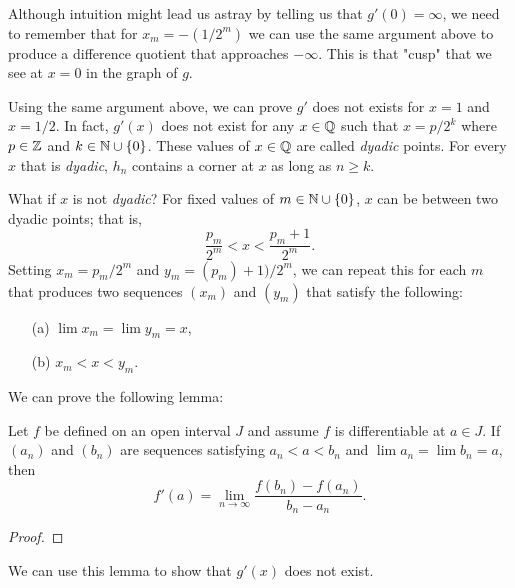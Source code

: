 Although intuition might lead us astray by telling us that \( g'(0) = \infty  \), we need to remember that for \( x_m = -(1/2^m) \) we can use the same argument above to produce a difference quotient that approaches \( - \infty  \). This is that "cusp" that we see at \( x = 0  \) in the graph of \( g  \). 

Using the same argument above, we can prove \( g' \) does not exists for \( x = 1  \) and \( x = 1 / 2 \). In fact, \( g'(x)  \) does not exist for any \( x \in \mathbb{Q}  \) such that \( x = p/2^k \) where \( p \in \mathbb{Z}  \) and \( k \in \mathbb{N} \cup \{ 0 \}  \). These values of \( x \in \mathbb{Q}  \) are called \textit{dyadic} points. For every \( x  \) that is \textit{dyadic}, \( h_n  \) contains a corner at \( x  \) as long as \( n \geq k  \). 

What if \( x  \) is not \textit{dyadic}? For fixed values of \( m \in \mathbb{N} \cup \{ 0  \}  \), \( x  \) can be between two dyadic points; that is, 
\[  \frac{ p_m  }{ 2^m } < x < \frac{ p_m + 1  }{ 2^m }. \] Setting \( x_m = p_m / 2^m \) and \( y_m = (p_m) + 1) / 2^m  \), we can repeat this for each \( m  \) that produces two sequences \( (x_m)  \) and \( (y_m)  \) that satisfy the following:
\begin{enumerate}
    \item[(a)] \( \lim x_m = \lim y_m = x   \), 
    \item[(b)] \( x_m < x < y_m \).
\end{enumerate}

We can prove the following lemma:

\begin{lemma}{}{}
Let \( f  \) be defined on an open interval \( J  \) and assume \( f  \) is differentiable at \( a \in J  \). If \( (a_n)  \) and \( (b_n)  \) are sequences satisfying \( a_n < a < b_n  \) and \( \lim a_n = \lim b_n = a  \), then 
\[ f'(a) = \lim_{ n \to \infty  } \frac{ f(b_n) - f(a_n)  }{ b_n - a_n  }. \]
\end{lemma}
\begin{proof}

\end{proof}
We can use this lemma to show that \( g'(x)  \) does not exist.




